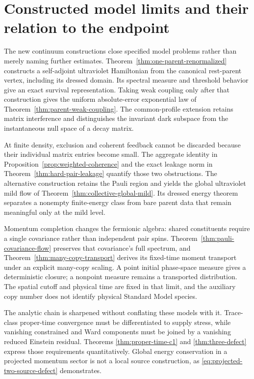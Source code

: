 \documentclass[11pt,a4paper,oneside]{book}
\theoremstyle{plain}
\theoremstyle{definition}
\theoremstyle{remark}
\begin{document}
\section{Constructed model limits and their relation to the endpoint}
The new continuum constructions close specified model problems rather
than merely naming further estimates.  Theorem~\ref{thm:one-parent-renormalized}
constructs a self-adjoint ultraviolet Hamiltonian from the canonical
rest-parent vertex, including its dressed domain.  Its spectral measure
and threshold behavior give an exact survival representation.  Taking
weak coupling only after that construction gives the uniform
absolute-error exponential law of
Theorem~\ref{thm:parent-weak-coupling}.  The common-profile extension
retains matrix interference and distinguishes the invariant dark
subspace from the instantaneous null space of a decay matrix.

At finite density, exclusion and coherent feedback cannot be discarded
because their individual matrix entries become small.  The aggregate
identity in Proposition~\ref{prop:weighted-coherence} and the exact
leakage norm in Theorem~\ref{thm:hard-pair-leakage} quantify those two
obstructions.  The alternative construction retains the Pauli region
and yields the global ultraviolet mild flow of
Theorem~\ref{thm:collective-global-mild}.  Its dressed energy theorem
separates a nonempty finite-energy class from bare parent data that
remain meaningful only at the mild level.

Momentum completion changes the fermionic algebra: shared constituents
require a single covariance rather than independent pair spins.
Theorem~\ref{thm:pauli-covariance-flow} preserves that covariance's full
spectrum, and Theorem~\ref{thm:many-copy-transport} derives its
fixed-time moment transport under an explicit many-copy scaling.
A point initial phase-space measure gives a deterministic closure;
a nonpoint measure remains a transported distribution.  The spatial
cutoff and physical time are fixed in that limit, and the auxiliary
copy number does not identify physical Standard Model species.

The analytic chain is sharpened without conflating these models with it.
Trace-class proper-time convergence must be differentiated to supply
stress, while vanishing constrained and Ward components must be joined
by a vanishing reduced Einstein residual.  Theorems
\ref{thm:proper-time-c1} and \ref{thm:three-defect} express those
requirements quantitatively.  Global energy conservation in a projected
momentum sector is not a local source construction, as
\eqref{eq:projected-two-source-defect} demonstrates.
\end{document}
